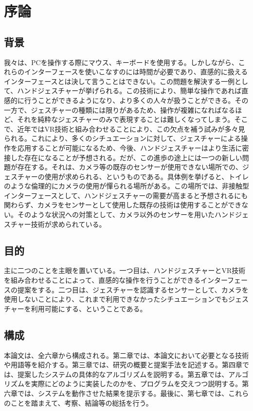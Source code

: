 \section{序論}

\subsection{背景}
我々は、PCを操作する際にマウス、キーボードを使用する。しかしながら、これらのインターフェースを使いこなすのには時間が必要であり、直感的に扱えるインターフェースとは決して言うことはできない。この問題を解決する一例として、ハンドジェスチャーが挙げられる。この技術により、簡単な操作であれば直感的に行うことができるようになり、より多くの人々が扱うことができる。その一方で、ジェスチャーの種類には限りがあるため、操作が複雑になればなるほど、それを純粋なジェスチャーのみで表現することは難しくなってしまう。そこで、近年ではVR技術と組み合わせることにより、この欠点を補う試みが多々見られる。これにより、多くのシチュエーションに対して、ジェスチャーによる操作を応用することが可能になるため、今後、ハンドジェスチャーはより生活に密接した存在になることが予想される。だが、この進歩の途上には一つの新しい問題が存在する。それは、カメラ等の既存のセンサーが使用できない場所での、ジェスチャーの使用が求められる、というものである。具体例を挙げると、トイレのような倫理的にカメラの使用が憚られる場所がある。この場所では、非接触型インターフェースとして、ハンドジェスチャーの需要が高まると予想されるにも関わらず、カメラをセンサーとして使用した既存の技術は使用することができない。そのような状況への対策として、カメラ以外のセンサーを用いたハンドジェスチャー技術が求められている。

\subsection{目的}
主に二つのことを主眼を置いている。一つ目は、ハンドジェスチャーとVR技術を組み合わせることによって、直感的な操作を行うことができるインターフェースの提案をする。二つ目は、ジェスチャーを認識するセンサーとして、カメラを使用しないことにより、これまで利用できなかったシチュエーションでもジェスチャーを利用可能にする、ということである。

\subsection{構成}
本論文は、全六章から構成される。第二章では、本論文において必要となる技術や用語等を紹介する。第三章では、研究の概要と提案手法を記述する。第四章では、提案したシステムの具体的なアルゴリズムを説明する。第五章では、アルゴリズムを実際にどのように実装したのかを、プログラムを交えつつ説明する。第六章では、システムを動作させた結果を提示する。最後に、第七章では、これらのことを踏まえて、考察、結論等の総括を行う。